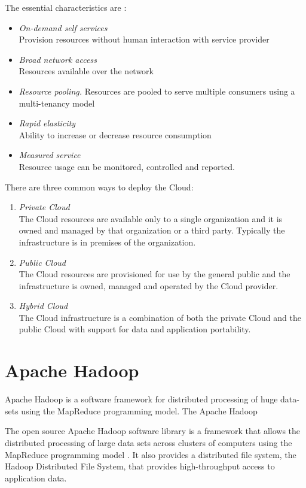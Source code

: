 \documentclass[12pt,a4paper]{report}
\begin{document}
The essential characteristics are \cite{mell2009nist} :

\begin{itemize}
  \item \emph{On-demand self services} \\ Provision resources without human
     interaction with service provider
  \item \emph{Broad network access} \\Resources available over the network
  \item \emph{Resource pooling.} Resources are pooled to serve multiple 
        consumers using a multi-tenancy model
  \item \emph{Rapid elasticity} \\Ability to increase or decrease resource consumption
  \item \emph{Measured service} \\Resource usage can be monitored, controlled and reported.
\end{itemize}

There are three common ways to deploy the Cloud:

\begin{enumerate}
 \item \emph{Private Cloud} \\The Cloud resources are available only 
to a single organization and it is owned and managed by 
that organization or a third party. Typically the infrastructure is in premises of the 
organization.
 \item \emph{Public Cloud} \\The Cloud resources are provisioned for use by the general 
public and the infrastructure is owned, managed and operated by the Cloud provider.
  \item \emph{Hybrid Cloud} \\The Cloud infrastructure is a combination of 
both the private Cloud and the public Cloud with support for data and application 
portability.
\end{enumerate}


\section{Apache Hadoop}

Apache Hadoop is a software framework for distributed processing of huge data-sets
using the MapReduce programming model. The Apache Hadoop 

The open source Apache Hadoop software library is a framework that 
allows the distributed processing of large data sets across clusters of 
computers using the MapReduce programming model \cite{website:apache-hadoop}. It also provides 
a distributed ﬁle system, the Hadoop Distributed File System, that provides 
high-throughput access to application data.
\end{document}
